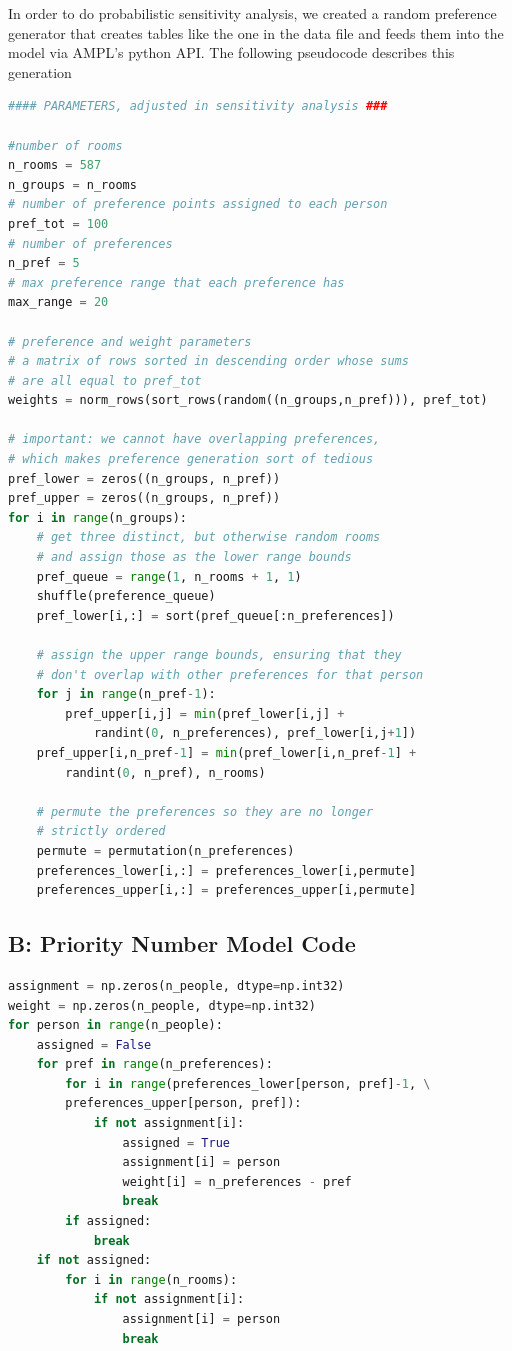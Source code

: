 \documentclass[12pt]{article}
\begin{document}
        In order to do probabilistic sensitivity analysis, we created a random preference generator that creates tables like the one in the data file and feeds them into the model via AMPL's python API. The following pseudocode describes this generation
\begin{lstlisting}[language=python]
#### PARAMETERS, adjusted in sensitivity analysis ###

#number of rooms
n_rooms = 587
n_groups = n_rooms
# number of preference points assigned to each person
pref_tot = 100
# number of preferences
n_pref = 5
# max preference range that each preference has
max_range = 20

# preference and weight parameters
# a matrix of rows sorted in descending order whose sums
# are all equal to pref_tot
weights = norm_rows(sort_rows(random((n_groups,n_pref))), pref_tot) 

# important: we cannot have overlapping preferences,
# which makes preference generation sort of tedious
pref_lower = zeros((n_groups, n_pref))
pref_upper = zeros((n_groups, n_pref))
for i in range(n_groups):
    # get three distinct, but otherwise random rooms
    # and assign those as the lower range bounds
    pref_queue = range(1, n_rooms + 1, 1)
    shuffle(preference_queue)
    pref_lower[i,:] = sort(pref_queue[:n_preferences])

    # assign the upper range bounds, ensuring that they
    # don't overlap with other preferences for that person
    for j in range(n_pref-1):
        pref_upper[i,j] = min(pref_lower[i,j] + 
            randint(0, n_preferences), pref_lower[i,j+1])
    pref_upper[i,n_pref-1] = min(pref_lower[i,n_pref-1] + 
        randint(0, n_pref), n_rooms)

    # permute the preferences so they are no longer
    # strictly ordered
    permute = permutation(n_preferences)
    preferences_lower[i,:] = preferences_lower[i,permute]
    preferences_upper[i,:] = preferences_upper[i,permute]
\end{lstlisting}


    
    \subsection*{B: Priority Number Model Code}
    \begin{lstlisting}[language=python]
assignment = np.zeros(n_people, dtype=np.int32)
weight = np.zeros(n_people, dtype=np.int32)
for person in range(n_people):
    assigned = False
    for pref in range(n_preferences):
        for i in range(preferences_lower[person, pref]-1, \
        preferences_upper[person, pref]):
            if not assignment[i]:
                assigned = True
                assignment[i] = person
                weight[i] = n_preferences - pref
                break
        if assigned:
            break
    if not assigned:
        for i in range(n_rooms):
            if not assignment[i]:
                assignment[i] = person
                break
    \end{lstlisting}
\end{document}
